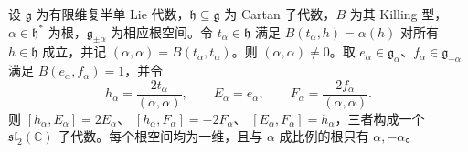 \begin{theorem}\label{b5:thm:root-sl2}
	设 \(\mathfrak g\) 为有限维复半单 Lie 代数，\(\mathfrak h\subseteq\mathfrak g\) 为 Cartan 子代数，\(B\) 为其 Killing 型，\(\alpha\in\mathfrak h^*\) 为根，\(\mathfrak g_{\pm\alpha}\) 为相应根空间。令 \(t_\alpha\in\mathfrak h\) 满足 \(B(t_\alpha,h)=\alpha(h)\) 对所有 \(h\in\mathfrak h\) 成立，并记 \((\alpha,\alpha)=B(t_\alpha,t_\alpha)\)。则 \((\alpha,\alpha)\ne0\)。取 \(e_\alpha\in\mathfrak g_\alpha\)、\(f_\alpha\in\mathfrak g_{-\alpha}\) 满足 \(B(e_\alpha,f_\alpha)=1\)，并令
	\[
		h_\alpha=\frac{2t_\alpha}{(\alpha,\alpha)},\qquad E_\alpha=e_\alpha,\qquad F_\alpha=\frac{2f_\alpha}{(\alpha,\alpha)}.
	\]
	则 \([h_\alpha,E_\alpha]=2E_\alpha\)、 \([h_\alpha,F_\alpha]=-2F_\alpha\)、 \([E_\alpha,F_\alpha]=h_\alpha\)，三者构成一个 \(\mathfrak{sl}_2(\mathbb C)\) 子代数。每个根空间均为一维，且与 \(\alpha\) 成比例的根只有 \(\alpha,-\alpha\)。
\end{theorem}
